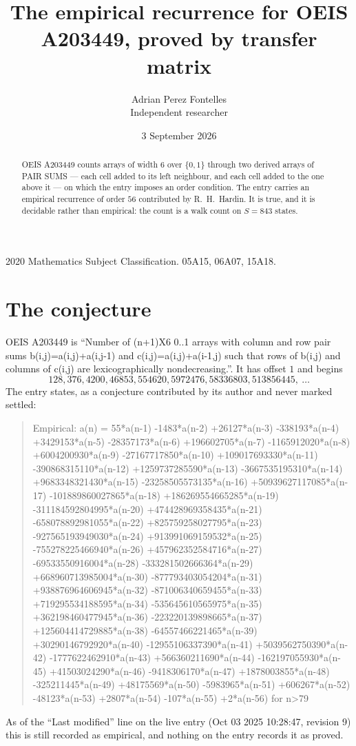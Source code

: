 \documentclass[11pt,a4paper]{article}
\title{The empirical recurrence for OEIS A203449, proved by transfer matrix}
\author{Adrian Perez Fontelles\\ \small Independent researcher}
\date{3 September 2026}
\theoremstyle{plain}
\theoremstyle{definition}
\begin{document}
\maketitle

\begin{abstract}
OEIS A203449 counts arrays of width $6$ over $\{0,1\}$ through two derived arrays of PAIR SUMS ---
each cell added to its left neighbour, and each cell added to the one above it --- on which the
entry imposes an order condition. The entry carries an empirical recurrence of order $56$
contributed by R.~H.~Hardin. It is true, and it is decidable rather than empirical: the count is
a walk count on $S=843$ states.
\end{abstract}

\noindent\small 2020 Mathematics Subject Classification. 05A15, 06A07, 15A18.\normalsize

\section{The conjecture}

OEIS A203449 is ``Number of (n+1)X6 0..1 arrays with column and row pair sums b(i,j)=a(i,j)+a(i,j-1) and c(i,j)=a(i,j)+a(i-1,j) such that rows of b(i,j) and columns of c(i,j) are lexicographically nondecreasing.''. It has offset $1$ and begins
\[
128, 376, 4200, 46853, 554620, 5972476, 58336803, 513856445,\ \dots
\]
The entry states, as a conjecture contributed by its author and never marked settled:
\begin{quote}
Empirical: a(n) = 55*a(n-1) -1483*a(n-2) +26127*a(n-3) -338193*a(n-4) +3429153*a(n-5) -28357173*a(n-6) +196602705*a(n-7) -1165912020*a(n-8) +6004200930*a(n-9) -27167717850*a(n-10) +109017693330*a(n-11) -390868315110*a(n-12) +1259737285590*a(n-13) -3667535195310*a(n-14) +9683348321430*a(n-15) -23258505573135*a(n-16) +50939627117085*a(n-17) -101889860027865*a(n-18) +186269554665285*a(n-19) -311184592804995*a(n-20) +474428969358435*a(n-21) -658078892981055*a(n-22) +825759258027795*a(n-23) -927565193949030*a(n-24) +913991069159532*a(n-25) -755278225466940*a(n-26) +457962352584716*a(n-27) -69533550916004*a(n-28) -333281502666364*a(n-29) +668960713985004*a(n-30) -877793403054204*a(n-31) +938876964606945*a(n-32) -871006340659455*a(n-33) +719295534188595*a(n-34) -535645610565975*a(n-35) +362198460477945*a(n-36) -223220139898665*a(n-37) +125604414729885*a(n-38) -64557466221465*a(n-39) +30290146792920*a(n-40) -12955106337390*a(n-41) +5039562750390*a(n-42) -1777622462910*a(n-43) +566360211690*a(n-44) -162197055930*a(n-45) +41503024290*a(n-46) -9418306170*a(n-47) +1878003855*a(n-48) -325211445*a(n-49) +48175569*a(n-50) -5983965*a(n-51) +606267*a(n-52) -48123*a(n-53) +2807*a(n-54) -107*a(n-55) +2*a(n-56) for n>79
\end{quote}
As of the ``Last modified'' line on the live entry (Oct 03 2025 10:28:47, revision 9) this is still
recorded as empirical, and nothing on the entry records it as proved.
\end{document}
